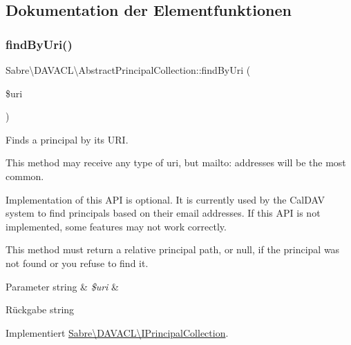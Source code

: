 \subsection{Dokumentation der Elementfunktionen}
\mbox{\label{class_sabre_1_1_d_a_v_a_c_l_1_1_abstract_principal_collection_aea345cf559cc83b45134fea498854293}} 
\subsubsection{\texorpdfstring{find\+By\+Uri()}{findByUri()}}
{\footnotesize\ttfamily Sabre\textbackslash{}\+D\+A\+V\+A\+C\+L\textbackslash{}\+Abstract\+Principal\+Collection\+::find\+By\+Uri (\begin{DoxyParamCaption}\item[{}]{\$uri }\end{DoxyParamCaption})}

Finds a principal by its U\+RI.

This method may receive any type of uri, but mailto\+: addresses will be the most common.

Implementation of this A\+PI is optional. It is currently used by the Cal\+D\+AV system to find principals based on their email addresses. If this A\+PI is not implemented, some features may not work correctly.

This method must return a relative principal path, or null, if the principal was not found or you refuse to find it.


\begin{DoxyParams}[1]{Parameter}
string & {\em \$uri} & \\
\hline
\end{DoxyParams}
\begin{DoxyReturn}{Rückgabe}
string 
\end{DoxyReturn}


Implementiert \mbox{\hyperlink{interface_sabre_1_1_d_a_v_a_c_l_1_1_i_principal_collection_a7b8893f6a37a399cf37afe5dfda85d33}{Sabre\textbackslash{}\+D\+A\+V\+A\+C\+L\textbackslash{}\+I\+Principal\+Collection}}.



